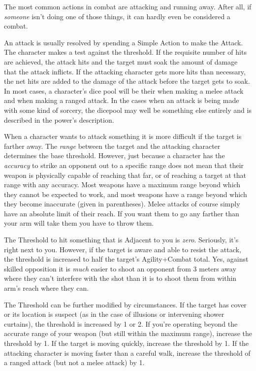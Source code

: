 The most common actions in combat are attacking and running away. After all, if \textit{someone} isn't doing one of those things, it can hardly even be considered a combat.

An attack is usually resolved by spending a Simple Action to make the Attack. The character makes a test against the threshold. If the requisite number of hits are achieved, the attack hits and the target must soak the amount of damage that the attack inflicts. If the attacking character gets more hits than necessary, the net hits are added to the damage of the attack before the target gets to soak. In most cases, a character's dice pool will be their  when making a melee attack and  when making a ranged attack. In the cases when an attack is being made with some kind of sorcery, the dicepool may well be something else entirely and is described in the power's description.

When a character wants to attack something it is more difficult if the target is farther away. The \textit{range} between the target and the attacking character determines the base threshold. However, just because a character has the \textit{accuracy} to strike an opponent out to a specific range does not mean that their weapon is physically capable of reaching that far, or of reaching a target at that range with any accuracy. Most weapons have a maximum range beyond which they cannot be expected to work, and most weapons have a range beyond which they become inaccurate (given in parentheses). Melee attacks of course simply have an absolute limit of their reach. If you want them to go any farther than your arm will take them you have to throw them.

The Threshold to hit something that is Adjacent to you is \textit{zero}. Seriously, it's right next to you. However, if the target is aware and able to resist the attack, the threshold is increased to half the target's Agility+Combat total. Yes, against skilled opposition it is \textit{much} easier to shoot an opponent from 3 meters away where they can't interfere with the shot than it is to shoot them from within arm's reach where they can.

The Threshold can be further modified by circumstances. If the target has cover or its location is suspect (as in the case of illusions or intervening shower curtains), the threshold is increased by 1 or 2. If you're operating beyond the accurate range of your weapon (but still within the maximum range), increase the threshold by 1. If the target is moving quickly, increase the threshold by 1. If the attacking character is moving faster than a careful walk, increase the threshold of a ranged attack (but not a melee attack) by 1.

